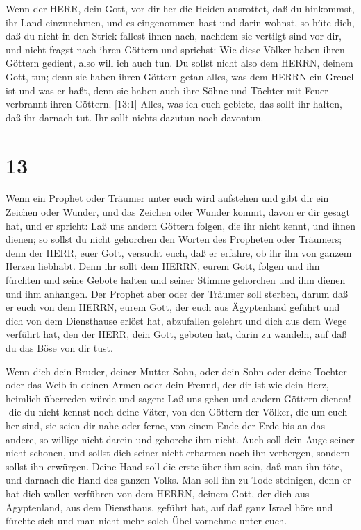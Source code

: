  Wenn der HERR, dein Gott, vor dir her die Heiden
ausrottet, daß du hinkommst, ihr Land einzunehmen, und es eingenommen
hast und darin wohnst,  so hüte dich, daß du nicht in den
Strick fallest ihnen nach, nachdem sie vertilgt sind vor dir, und nicht
fragst nach ihren Göttern und sprichst: Wie diese Völker haben ihren
Göttern gedient, also will ich auch tun.  Du sollst nicht
also dem HERRN, deinem Gott, tun; denn sie haben ihren Göttern getan
alles, was dem HERRN ein Greuel ist und was er haßt, denn sie haben auch
ihre Söhne und Töchter mit Feuer verbrannt ihren Göttern. 
{[}13:1{]} Alles, was ich euch gebiete, das sollt ihr halten, daß ihr
darnach tut. Ihr sollt nichts dazutun noch davontun.

\hypertarget{section-12}{%
\section{13}\label{section-12}}

 Wenn ein Prophet oder Träumer unter euch wird aufstehen und
gibt dir ein Zeichen oder Wunder,  und das Zeichen oder
Wunder kommt, davon er dir gesagt hat, und er spricht: Laß uns andern
Göttern folgen, die ihr nicht kennt, und ihnen dienen;  so
sollst du nicht gehorchen den Worten des Propheten oder Träumers; denn
der HERR, euer Gott, versucht euch, daß er erfahre, ob ihr ihn von
ganzem Herzen liebhabt.  Denn ihr sollt dem HERRN, eurem
Gott, folgen und ihn fürchten und seine Gebote halten und seiner Stimme
gehorchen und ihm dienen und ihm anhangen.  Der Prophet aber
oder der Träumer soll sterben, darum daß er euch von dem HERRN, eurem
Gott, der euch aus Ägyptenland geführt und dich von dem Diensthause
erlöst hat, abzufallen gelehrt und dich aus dem Wege verführt hat, den
der HERR, dein Gott, geboten hat, darin zu wandeln, auf daß du das Böse
von dir tust.

 Wenn dich dein Bruder, deiner Mutter Sohn, oder dein Sohn
oder deine Tochter oder das Weib in deinen Armen oder dein Freund, der
dir ist wie dein Herz, heimlich überreden würde und sagen: Laß uns gehen
und andern Göttern dienen! -die du nicht kennst noch deine Väter,
 von den Göttern der Völker, die um euch her sind, sie seien
dir nahe oder ferne, von einem Ende der Erde bis an das andere,
 so willige nicht darein und gehorche ihm nicht. Auch soll
dein Auge seiner nicht schonen, und sollst dich seiner nicht erbarmen
noch ihn verbergen,  sondern sollst ihn erwürgen. Deine Hand
soll die erste über ihm sein, daß man ihn töte, und darnach die Hand des
ganzen Volks.  Man soll ihn zu Tode steinigen, denn er hat
dich wollen verführen von dem HERRN, deinem Gott, der dich aus
Ägyptenland, aus dem Diensthaus, geführt hat,  auf daß ganz
Israel höre und fürchte sich und man nicht mehr solch Übel vornehme
unter euch.

